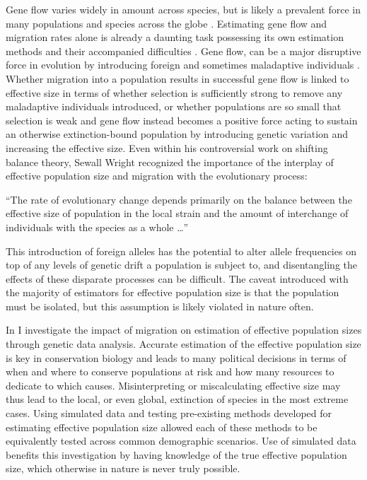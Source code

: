 Gene flow varies widely in amount across species, but is likely a prevalent force in many populations and species across the globe \citep{Slatkin:1985, Slatkin:1987}. 
Estimating gene flow and migration rates alone is already a daunting task possessing its own estimation methods and their accompanied difficulties \citep{Beerli:2001, Hey:2004, Kuhner:2006, Whitlock:1999}. Gene flow, can be a major disruptive force in evolution by introducing foreign and sometimes maladaptive individuals \citep{Slatkin:1987}. Whether migration into a population results in successful gene flow is linked to effective size in terms of whether selection is sufficiently strong to remove any maladaptive individuals introduced, or whether populations are so small that selection is weak and gene flow instead becomes a positive force acting to sustain an otherwise extinction-bound population by introducing genetic variation and increasing the effective size. Even within his controversial work on shifting balance theory, Sewall Wright recognized the importance of the interplay of effective population size and migration with the evolutionary process: %
\begin{quoteshrink}
  ``The rate of evolutionary change depends primarily on the balance between the effective size of population in the local strain and the amount of interchange of individuals with the species as a whole \dots''
  \hfill\citet{Wright:1930}
\end{quoteshrink}
This introduction of foreign alleles has the potential to alter allele frequencies on top of any levels of genetic drift a population is subject to, and disentangling the effects of these disparate processes can be difficult. The caveat introduced with the majority of estimators for effective population size is that the population must be isolated, but this assumption is likely violated in nature often.

In  I investigate the impact of migration on estimation of effective population sizes through genetic data analysis. Accurate estimation of the effective population size is key in conservation biology and leads to many political decisions in terms of when and where to conserve populations at risk and how many resources to dedicate to which causes. Misinterpreting or miscalculating effective size may thus lead to the local, or even global, extinction of species in the most extreme cases. Using simulated data and testing pre-existing methods developed for estimating effective population size allowed each of these methods to be equivalently tested across common demographic scenarios. Use of simulated data benefits this investigation by having knowledge of the true effective population size, which otherwise in nature is never truly possible.

